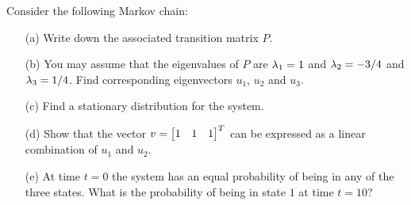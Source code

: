 \documentclass[a4paper]{article}
\begin{document}
\begin{problem}[Mock 1]
 Consider the following Markov chain:
 \begin{center}
 \end{center}
 \begin{itemize}
  \item[(a)] Write down the associated transition matrix $P$. 
  \item[(b)] You may assume that the eigenvalues of $P$ are $\lambda_1=1$
   and $\lambda_2=-3/4$ and $\lambda_3=1/4$.  Find corresponding eigenvectors
   $u_1$, $u_2$ and $u_3$.  
  \item[(c)] Find a stationary distribution for the system. 
  \item[(d)] Show that the vector $v=\left[\begin{matrix} 1&1&1\end{matrix}\right]^T$ can be
   expressed as a linear combination of $u_1$ and $u_2$. 
  \item[(e)] At time $t=0$ the system has an equal probability of
   being in any of the three states.  What is the probability of 
   being in state $1$ at time $t=10$? 
 \end{itemize}
\end{problem}
\end{document}
